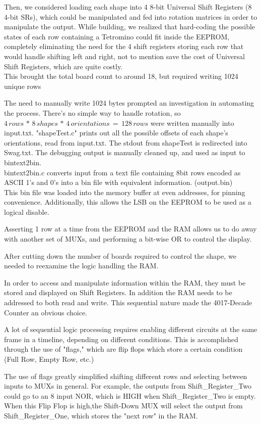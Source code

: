 \documentclass[letterpaper,titlepage,oneside]{article}
\begin{document}
Then, we considered loading each shape into 4 8-bit Universal Shift Registers (8 4-bit SRs), which could be manipulated and fed into rotation matrices in order to manipulate the output. While building, we realized that hard-coding the possible states of each row containing a Tetromino could fit inside the EEPROM, completely eliminating the need for the 4 shift registers storing each row that would handle shifting left and right, not to mention save the cost of Universal Shift Registers, which are quite costly. \\
This brought the total board count to around 18, but required writing 1024 unique rows

The need to manually write 1024 bytes prompted an investigation in automating the process. There's no simple way to handle rotation, so 
$ 4 \,rows\, *\, 8\, shapes\, *\, 4 \,orientations \,=\, 128\, rows$
were written manually into input.txt. "shapeTest.c" prints out all the possible offsets of each shape's orientations, read from input.txt. The stdout from shapeTest is redirected into Swag.txt. The debugging output is manually cleaned up, and used as input to bintext2bin.\\
bintext2bin.c converts input from a text file containing 8bit rows encoded as ASCII 1's and 0's into a bin file with equivalent information. (output.bin)\\
This bin file was loaded into the memory buffer at even addresses, for pinning convenience. Additionally, this allows the LSB on the EEPROM to be used as a logical disable.

Asserting 1 row at a time from the EEPROM and the RAM allows us to do away with another set of MUXs, and performing a bit-wise OR to control the display.

After cutting down the number of boards required to control the shape, we needed to reexamine the logic handling the RAM.

In order to access and manipulate information within the RAM, they must be stored and displayed on Shift Registers. In addition the RAM needs to be addressed to both read and write. This sequential nature made the 4017-Decade Counter an obvious choice.

A lot of sequential logic processing requires enabling different circuits at the same frame in a timeline, depending on different conditions. This is accomplished through the use of "flags," which are flip flops which store a certain condition (Full Row, Empty Row, etc.)

The use of flags greatly simplified shifting different rows and selecting between inputs to MUXs in general. For example, the outputs from Shift\_Register\_Two could go to an 8 input NOR, which is HIGH when Shift\_Register\_Two is empty. When this Flip Flop is high,the Shift-Down MUX will select the output from Shift\_Register\_One, which stores the "next row" in the RAM. 
\end{document}
